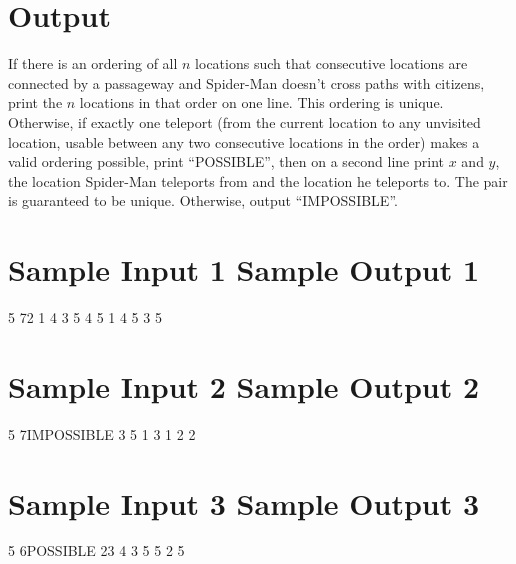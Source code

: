 \documentclass[11pt]{article}
\begin{document}
\section*{Output}

If there is an ordering of all $n$ locations such that consecutive locations are connected by a 
passageway and Spider-Man doesn’t cross paths with citizens, print the $n$ locations in that order on one line. 
This ordering is unique.\newline
Otherwise, if exactly one teleport (from the current location to any unvisited location, 
usable between any two consecutive locations in the order) makes a valid ordering possible, 
print “POSSIBLE”, then on a second line print $x$ and $y$, the location Spider-Man teleports from and 
the location he teleports to. The pair is guaranteed to be unique. \newline
Otherwise, output “IMPOSSIBLE”.

\section*{Sample Input 1	Sample Output 1}
5 7\hspace{10em}2 1 4 3 5 4 5 1 4 5 3 5\newline

\section*{Sample Input 2	Sample Output 2}
5 7\hspace{10em}IMPOSSIBLE 3 5 1 3 1 2 2

\section*{Sample Input 3	Sample Output 3}
5 6\hspace{10em}POSSIBLE 2\hspace{10em}3 4 3 5 5 2 5
\end{document}
